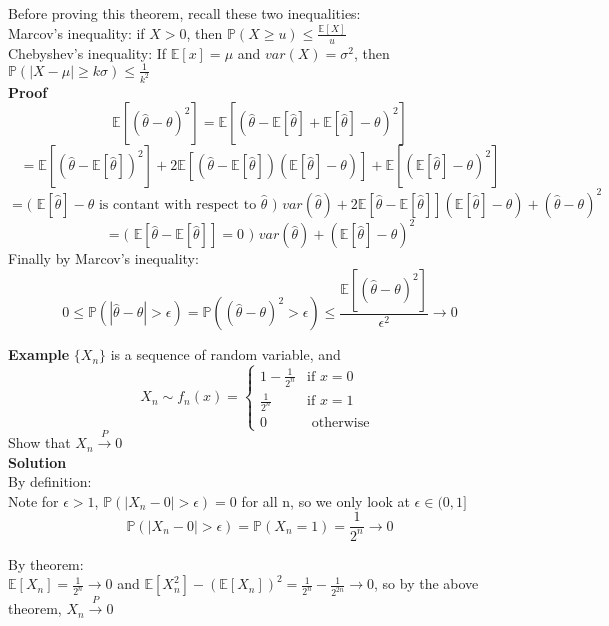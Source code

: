 Before proving this theorem, recall these two inequalities:\\
Marcov's inequality: if $X > 0$, then $\mathbb{P}(X\geq u) \leq \frac{\mathbb{E}[X]}{u}$\\
Chebyshev's inequality: If $\mathbb{E}[x] = \mu$ and $var(X) = \sigma^2$, then $\mathbb{P}(|X-\mu| \geq k\sigma) \leq \frac{1}{k^2}$\\

\textbf{Proof} $$\mathbb{E}[(\hat{\theta} - \theta)^2] = \mathbb{E}[(\hat{\theta} - \mathbb{E}[\hat{\theta}] + \mathbb{E}[\hat{\theta}] - \theta)^2]$$
$$= \mathbb{E}[(\hat{\theta} - \mathbb{E}[\hat{\theta}])^2] + 2\mathbb{E}[ (\hat{\theta} - \mathbb{E}[\hat{\theta}])(\mathbb{E}[\hat{\theta}] - \theta) ] + \mathbb{E}[(\mathbb{E}[\hat{\theta}] - \theta)^2]$$
$$=  \text{( } \mathbb{E}[\hat{\theta}] - \theta \text{ is contant with respect to } \hat{\theta} \text{ ) } var(\hat{\theta}) + 2\mathbb{E}[ \hat{\theta} - \mathbb{E}[\hat{\theta}]](\mathbb{E}[\hat{\theta}] - \theta) + (\hat{\theta} - \theta)^2$$
$$= \text{( } \mathbb{E}[ \hat{\theta} - \mathbb{E}[\hat{\theta}]] = 0 \text{ ) }var(\hat{\theta}) + (\mathbb{E}[\hat{\theta}] - \theta)^2$$
Finally by Marcov's inequality:
$$0 \leq \mathbb{P}( | \hat{\theta} - \theta | > \epsilon ) = \mathbb{P}( ( \hat{\theta} - \theta )^2 > \epsilon ) \leq \frac{\mathbb{E}[ ( \hat{\theta} - \theta )^2 ]}{\epsilon^2} \to 0$$

\textbf{Example} $\{X_n\}$ is a sequence of random variable, and
$$X_n \sim f_n(x) =
\begin{cases}
1-\frac{1}{2^n} & \text{if } x=0 \\
\frac{1}{2^n} & \text{if } x=1 \\
0 & \text{ otherwise }
\end{cases}$$
Show that $X_n \overset{P}{\to} 0$\\

\textbf{Solution} \\

By definition:\\
Note for $\epsilon > 1$, $\mathbb{P}( |X_n - 0| > \epsilon ) = 0$ for all n, so we only look at $\epsilon\in(0, 1]$\\
$$\mathbb{P}( |X_n - 0| > \epsilon ) = \mathbb{P}( X_n = 1 ) = \frac{1}{2^n} \to 0$$

By theorem:\\
$\mathbb{E}[X_n] = \frac{1}{2^n} \to 0$ and $\mathbb{E}[X_n^2]-(\mathbb{E}[X_n])^2 = \frac{1}{2^n} - \frac{1}{2^{2n}} \to 0$, so by the above theorem, $X_n \overset{P}{\to} 0$\\

